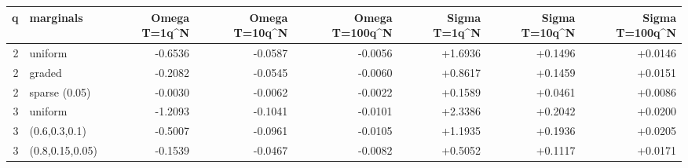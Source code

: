 \begin{tabular}{rlrrrrrr}
\toprule
q & marginals & Omega T=1q^N & Omega T=10q^N & Omega T=100q^N & Sigma T=1q^N & Sigma T=10q^N & Sigma T=100q^N \\
\midrule
2 & uniform & -0.6536 & -0.0587 & -0.0056 & +1.6936 & +0.1496 & +0.0146 \\
2 & graded & -0.2082 & -0.0545 & -0.0060 & +0.8617 & +0.1459 & +0.0151 \\
2 & sparse (0.05) & -0.0030 & -0.0062 & -0.0022 & +0.1589 & +0.0461 & +0.0086 \\
3 & uniform & -1.2093 & -0.1041 & -0.0101 & +2.3386 & +0.2042 & +0.0200 \\
3 & (0.6,0.3,0.1) & -0.5007 & -0.0961 & -0.0105 & +1.1935 & +0.1936 & +0.0205 \\
3 & (0.8,0.15,0.05) & -0.1539 & -0.0467 & -0.0082 & +0.5052 & +0.1117 & +0.0171 \\
\bottomrule
\end{tabular}
